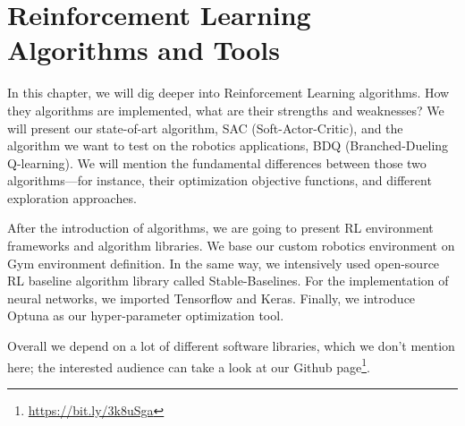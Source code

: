 \chapter{Reinforcement Learning Algorithms and Tools}\label{chapter:reinforcement_learning}

In this chapter, we will dig deeper into Reinforcement Learning algorithms. How they algorithms are implemented, what are their strengths and weaknesses? We will present our state-of-art algorithm, SAC (Soft-Actor-Critic), and the algorithm we want to test on the robotics applications, BDQ (Branched-Dueling Q-learning). We will mention the fundamental differences between those two algorithms—for instance, their optimization objective functions, and different exploration approaches. 

After the introduction of algorithms, we are going to present RL environment frameworks and algorithm libraries. We base our custom robotics environment on Gym environment definition. In the same way, we intensively used open-source RL baseline algorithm library called Stable-Baselines. For the implementation of neural networks, we imported Tensorflow and Keras. Finally, we introduce Optuna as our hyper-parameter optimization tool. 

Overall we depend on a lot of different software libraries, which we don’t mention here; the interested audience can take a look at our Github page\footnote{\url{https://bit.ly/3k8uSga}}.






% 